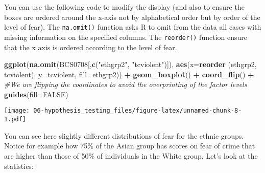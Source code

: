 \documentclass[
]{book}
\newenvironment{Shaded}{\begin{snugshade}}{\end{snugshade}}
\newcommand{\AttributeTok}[1]{\textcolor[rgb]{0.13,0.29,0.53}{#1}}
\newcommand{\CommentTok}[1]{\textcolor[rgb]{0.56,0.35,0.01}{\textit{#1}}}
\newcommand{\ConstantTok}[1]{\textcolor[rgb]{0.56,0.35,0.01}{#1}}
\newcommand{\FunctionTok}[1]{\textcolor[rgb]{0.13,0.29,0.53}{\textbf{#1}}}
\newcommand{\NormalTok}[1]{#1}
\newcommand{\SpecialCharTok}[1]{\textcolor[rgb]{0.81,0.36,0.00}{\textbf{#1}}}
\newcommand{\StringTok}[1]{\textcolor[rgb]{0.31,0.60,0.02}{#1}}
\begin{document}
You can use the following code to modify the display (and also to ensure the boxes are ordered around the x-axis not by alphabetical order but by order of the level of fear). The \texttt{na.omit()} function asks R to omit from the data all cases with missing information on the specified columns. The \texttt{reorder()} function ensure that the x axis is ordered according to the level of fear.

\begin{Shaded}
\begin{Highlighting}[]
\FunctionTok{ggplot}\NormalTok{(}\FunctionTok{na.omit}\NormalTok{(BCS0708[,}\FunctionTok{c}\NormalTok{(}\StringTok{"ethgrp2"}\NormalTok{, }\StringTok{"tcviolent"}\NormalTok{)]), }\FunctionTok{aes}\NormalTok{(}\AttributeTok{x=}\FunctionTok{reorder}\NormalTok{ (ethgrp2, tcviolent), }\AttributeTok{y=}\NormalTok{tcviolent, }\AttributeTok{fill=}\NormalTok{ethgrp2)) }\SpecialCharTok{+}
  \FunctionTok{geom\_boxplot}\NormalTok{() }\SpecialCharTok{+}
  \FunctionTok{coord\_flip}\NormalTok{() }\SpecialCharTok{+} \CommentTok{\#We are flipping the coordinates to avoid the overprinting of the factor levels}
  \FunctionTok{guides}\NormalTok{(}\AttributeTok{fill=}\ConstantTok{FALSE}\NormalTok{)}
\end{Highlighting}
\end{Shaded}

\texttt{[image: 06-hypothesis\_testing\_files/figure-latex/unnamed-chunk-8-1.pdf]}

You can see here slightly different distributions of fear for the ethnic groups. Notice for example how 75\% of the Asian group has scores on fear of crime that are higher than those of 50\% of individuals in the White group. Let's look at the statistics:

\begin{Shaded}
\end{Shaded}
\end{document}
